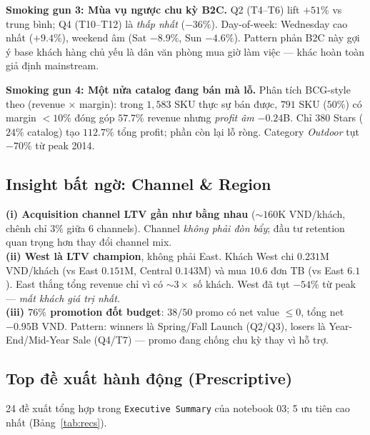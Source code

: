 \documentclass[10pt]{article}
\begin{document}
\textbf{Smoking gun 3: Mùa vụ ngược chu kỳ B2C.}
Q2 (T4--T6) lift $+51\%$ vs trung bình; Q4 (T10--T12) là \emph{thấp nhất} ($-36\%$). Day-of-week: Wednesday cao nhất ($+9.4\%$), weekend âm (Sat $-8.9\%$, Sun $-4.6\%$). Pattern phản B2C này gợi ý base khách hàng chủ yếu là dân văn phòng mua giờ làm việc --- khác hoàn toàn giả định mainstream.

\textbf{Smoking gun 4: Một nửa catalog đang bán mà lỗ.}
Phân tích BCG-style theo (revenue $\times$ margin): trong $1{,}583$ SKU thực sự bán được, $791$ SKU ($50\%$) có margin $<10\%$ đóng góp $57.7\%$ revenue nhưng \emph{profit âm} $-0.24$B. Chỉ $380$ Stars ($24\%$ catalog) tạo $112.7\%$ tổng profit; phần còn lại lỗ ròng. Category \emph{Outdoor} tụt $-70\%$ từ peak 2014.

\subsection{Insight bất ngờ: Channel \& Region}

\textbf{(i) Acquisition channel LTV gần như bằng nhau} ($\sim 160$K VND/khách, chênh chỉ $3\%$ giữa 6 channels). Channel \emph{không phải đòn bẩy}; đầu tư retention quan trọng hơn thay đổi channel mix.\\
\textbf{(ii) West là LTV champion}, không phải East. Khách West chi $0.231$M VND/khách (vs East $0.151$M, Central $0.143$M) và mua $10.6$ đơn TB (vs East $6.1$). East thắng tổng revenue chỉ vì có $\sim 3\times$ số khách. West đã tụt $-54\%$ từ peak --- \emph{mất khách giá trị nhất}.\\
\textbf{(iii) $76\%$ promotion đốt budget}: $38/50$ promo có net value $\le 0$, tổng net $-0.95$B VND. Pattern: winners là Spring/Fall Launch (Q2/Q3), losers là Year-End/Mid-Year Sale (Q4/T7) --- promo đang chống chu kỳ thay vì hỗ trợ.

\subsection{Top đề xuất hành động (Prescriptive)}

24 đề xuất tổng hợp trong \texttt{Executive Summary} của notebook 03; 5 ưu tiên cao nhất (Bảng~\ref{tab:recs}).
\end{document}
